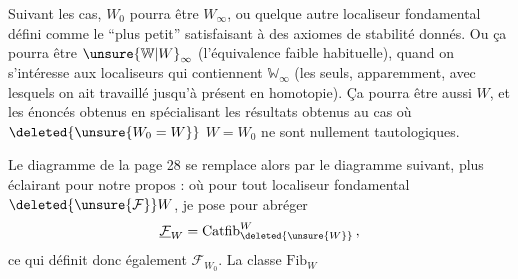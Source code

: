 Suivant les cas, $W_0$ pourra être $W_\infty$, ou quelque
autre localiseur fondamental défini comme le
``plus petit'' satisfaisant à des axiomes de stabilité
donnés. Ou ça pourra être $\unsure{\mathbb W|W}_\infty$ (l'équivalence
faible habituelle), quand on s'intéresse aux
localiseurs qui contiennent $\mathbb W_\infty$ (les seuls, apparemment, avec lesquels on ait travaillé jusqu'à présent en homotopie). Ça pourra être
aussi $W$, et les énoncés obtenus en spécialisant les résultats obtenus au cas où $\deleted{\unsure{W_0=W}}$
$W=W_0$ ne sont nullement tautologiques.

Le diagramme de la page 28 se remplace alors
par le diagramme  suivant, plus éclairant
pour notre propos :
où pour tout localiseur fondamental $\deleted{\unsure{\mathcal F}}W$, je
pose pour abréger
\[
\underline{\mathcal F}_W=\mathrm{Catfib}^{W}_{\deleted{\unsure{W}}}\,,
\]
ce qui définit donc également $\mathcal F_{W_0}$. La classe $\mathrm{Fib}_W$
